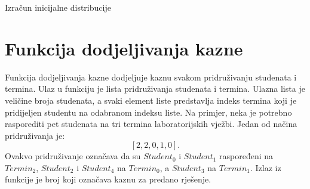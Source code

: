 \documentclass[times, utf8, zavrsni]{fer}
\begin{document}
\begin{algorithm}
  \caption{Izračun inicijalne distribucije}
  \label{algo:inicijalna_distribucija}
  \begin{algorithmic}



      \ENDIF

      \ENDIF

      \ENDIF
    \ENDFOR
  \ENDFOR


    \ENDFOR
  \ENDFOR

    \ENDFOR
  \ENDFOR



  \end{algorithmic}
  \end{algorithm}




\section{Funkcija dodjeljivanja kazne}
Funkcija dodjeljivanja kazne dodjeljuje kaznu svakom pridruživanju studenata i termina. Ulaz u funkciju je
lista pridruživanja studenata i termina. Ulazna lista je veličine broja studenata, a svaki element liste predstavlja
indeks termina koji je pridijeljen studentu na odabranom indeksu liste. Na primjer, neka je potrebno rasporediti pet studenata
na tri termina laboratorijskih vježbi. Jedan od načina pridruživanja je:
$$
[2, 2, 0, 1, 0].
$$
Ovakvo pridruživanje označava da su $Student_0$ i $Student_1$ raspoređeni na $Termin_2$,
$Student_2$ i $Student_4$ na $Termin_0$, a $Student_3$ na $Termin_1$. Izlaz iz funkcije je broj koji označava kaznu
za predano rješenje.
\end{document}
